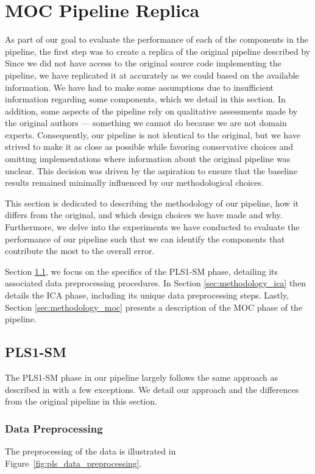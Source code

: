 \section{MOC Pipeline Replica}\label{sec:methodology}
As part of our goal to evaluate the performance of each of the components in the pipeline, the first step was to create a replica of the original pipeline described by \citet{cleggRecalibrationMarsScience2017}
Since we did not have access to the original source code implementing the pipeline, we have replicated it at accurately as we could based on the available information.
We have had to make some assumptions due to insufficient information regarding some components, which we detail in this section.
In addition, some aspects of the pipeline rely on qualitative assessments made by the original authors --- something we cannot do because we are not domain experts.
Consequently, our pipeline is not identical to the original, but we have strived to make it as close as possible while favoring conservative choices and omitting implementations where information about the original pipeline was unclear.
This decision was driven by the aspiration to ensure that the baseline results remained minimally influenced by our methodological choices.

This section is dedicated to describing the methodology of our pipeline, how it differs from the original, and which design choices we have made and why.
Furthermore, we delve into the experiments we have conducted to evaluate the performance of our pipeline such that we can identify the components that contribute the most to the overall error.

Section \ref{sec:methodology_pls1}, we focus on the specifics of the PLS1-SM phase, detailing its associated data preprocessing procedures.
In Section \ref{sec:methodology_ica} then details the ICA phase, including its unique data preprocessing steps.
Lastly, Section \ref{sec:methodology_moc} presents a description of the MOC phase of the pipeline.

\subsection{PLS1-SM}\label{sec:methodology_pls1}
The PLS1-SM phase in our pipeline largely follows the same approach as described in \citet{andersonImprovedAccuracyQuantitative2017} with a few exceptions.
We detail our approach and the differences from the original pipeline in this section.

\subsubsection{Data Preprocessing}\label{sec:pls1_data_preprocessing}
The preprocessing of the data is illustrated in Figure~\ref{fig:pls_data_preprocessing}.

